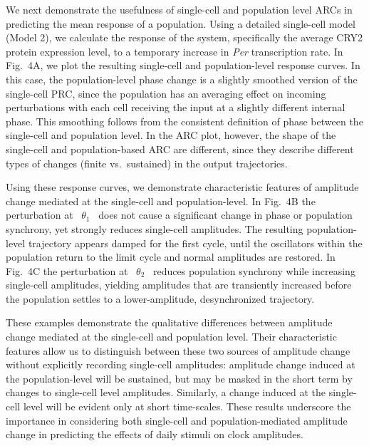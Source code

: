 \documentclass[11pt, letterpaper]{article}
\providecommand{\DIFadd}[1]{{\protect\color{blue}#1}} %
\begin{document}
\DIFadd{We next demonstrate the usefulness of single-cell and population level ARCs in predicting the mean response of a population.
Using a detailed single-cell model (Model 2), we calculate the response of the system, specifically the average CRY2 protein expression level, to a temporary increase in }{\itshape \DIFadd{Per}} \DIFadd{transcription rate.
In Fig.~4A, we plot the resulting single-cell and population-level response curves.
In this case, the population-level phase change is a slightly smoothed version of the single-cell PRC, since the population has an averaging effect on incoming perturbations with each cell receiving the input at a slightly different internal phase.
This smoothing follows from the consistent definition of phase between the single-cell and population level.
In the ARC plot, however, the shape of the single-cell and population-based ARC are different, since they describe different types of changes (finite vs.}\ \DIFadd{sustained) in the output trajectories.
}

\DIFadd{Using these response curves, we demonstrate characteristic features of amplitude change mediated at the single-cell and population-level.
In Fig.~4B the perturbation at \mbox{%
$\theta_1$
}%
does not cause a significant change in phase or population synchrony, yet strongly reduces single-cell amplitudes.
The resulting population-level trajectory appears damped for the first cycle, until the oscillators within the population return to the limit cycle and normal amplitudes are restored.
In Fig.~4C the perturbation at \mbox{%
$\theta_2$
}%
reduces population synchrony while increasing single-cell amplitudes, yielding amplitudes that are transiently increased before the population settles to a lower-amplitude, desynchronized trajectory.
}

\DIFadd{These examples demonstrate the qualitative differences between amplitude change mediated at the single-cell and population level.
Their characteristic features allow us to distinguish between these two sources of amplitude change without explicitly recording single-cell amplitudes: amplitude change induced at the population-level will be sustained, but may be masked in the short term by changes to single-cell level amplitudes.
Similarly, a change induced at the single-cell level will be evident only at short time-scales.
These results underscore the importance in considering both single-cell and population-mediated amplitude change in predicting the effects of daily stimuli on clock amplitudes.
}
\end{document}
